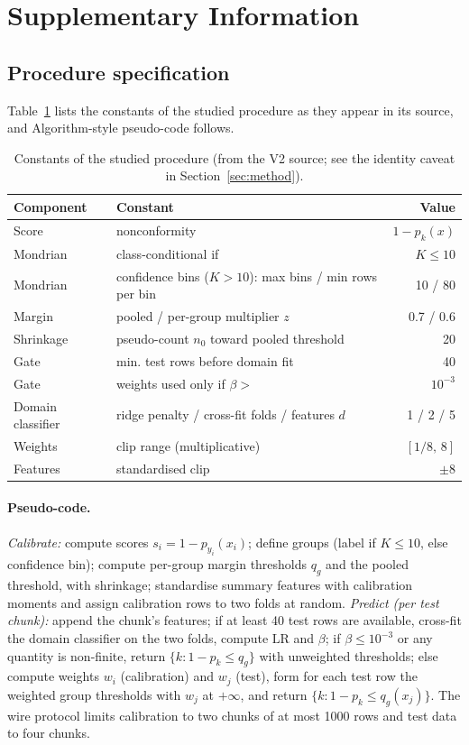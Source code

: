 \documentclass{article}
\begin{document}
\clearpage
\appendix
\section{Supplementary Information}

\subsection{Procedure specification}
Table~\ref{tab:hyper} lists the constants of the studied procedure as they appear in its source, and Algorithm-style pseudo-code follows.

\begin{table}[h]
\centering
\caption{Constants of the studied procedure (from the V2 source; see the identity caveat in Section~\ref{sec:method}).}
\label{tab:hyper}
\begin{tabular}{llr}
\toprule
Component & Constant & Value \\
\midrule
Score & nonconformity & $1-p_k(x)$ \\
Mondrian & class-conditional if & $K\le10$ \\
Mondrian & confidence bins ($K>10$): max bins / min rows per bin & 10 / 80 \\
Margin & pooled / per-group multiplier $z$ & 0.7 / 0.6 \\
Shrinkage & pseudo-count $n_0$ toward pooled threshold & 20 \\
Gate & min. test rows before domain fit & 40 \\
Gate & weights used only if $\beta>$ & $10^{-3}$ \\
Domain classifier & ridge penalty / cross-fit folds / features $d$ & 1 / 2 / 5 \\
Weights & clip range (multiplicative) & $[1/8,\,8]$ \\
Features & standardised clip & $\pm8$ \\
\bottomrule
\end{tabular}
\end{table}

\paragraph{Pseudo-code.}
\emph{Calibrate:} compute scores $s_i=1-p_{y_i}(x_i)$; define groups (label if $K\le10$, else confidence bin); compute per-group margin thresholds $q_g$ and the pooled threshold, with shrinkage; standardise summary features with calibration moments and assign calibration rows to two folds at random.
\emph{Predict (per test chunk):} append the chunk's features; if at least 40 test rows are available, cross-fit the domain classifier on the two folds, compute $\mathrm{LR}$ and $\beta$; if $\beta\le10^{-3}$ or any quantity is non-finite, return $\{k:1-p_k\le q_{g}\}$ with unweighted thresholds; else compute weights $w_i$ (calibration) and $w_j$ (test), form for each test row the weighted group thresholds with $w_j$ at $+\infty$, and return $\{k:1-p_k\le q_{g}(x_j)\}$. The wire protocol limits calibration to two chunks of at most 1000 rows and test data to four chunks.
\end{document}
